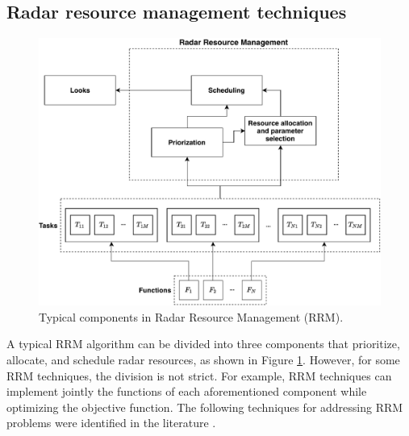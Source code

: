 \documentclass[english, 12pt, a4paper, elec, utf8, a-1b, online]{aaltothesis}
\numberwithin{equation}{section}
\begin{document}
\subsection{Radar resource management techniques} \label{sec:RRM_tech}

\begin{figure}[tb]
    \centering
    \includegraphics[width=.9\linewidth]{figures/RRM_diagram.pdf}
    \caption{Typical components in Radar Resource Management (RRM).}
    \label{fig:RRM_diagram}
\end{figure}

A typical RRM algorithm can be divided into three components that prioritize, allocate, and schedule radar resources, as shown in Figure \ref{fig:RRM_diagram}.
However, for some RRM techniques, the division is not strict.
For example, RRM techniques can implement jointly the functions of each aforementioned component while optimizing the objective function.
The following techniques for addressing RRM problems were identified in the literature \cite{Moo2016, Koch1999, Krishnamurthy2001, Wintenby2006, LaScala2006, Rajkumar1997, Rajkumar1998, Kastella1997, Kreucher2004, Kreucher2005, Xu2010}.
\end{document}
